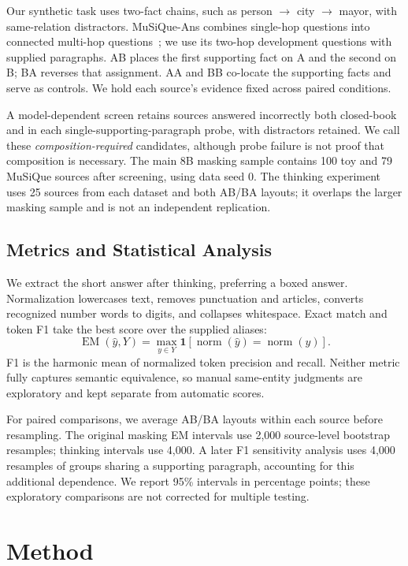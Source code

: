 \documentclass[sigconf,nonacm]{acmart}
\newcommand{\EM}{\operatorname{EM}}
\begin{document}
Our synthetic task uses two-fact chains, such as person $\rightarrow$ city
$\rightarrow$ mayor, with same-relation distractors. MuSiQue-Ans combines
single-hop questions into connected multi-hop questions~\cite{musique2022};
we use its two-hop development questions with supplied paragraphs.
AB places the first supporting fact on A and the second on B; BA reverses
that assignment. AA and BB co-locate the supporting facts and serve as
controls. We hold each source's evidence fixed across paired conditions.

A model-dependent screen retains sources answered incorrectly both
closed-book and in each single-supporting-paragraph probe, with distractors
retained. We call these \emph{composition-required} candidates, although
probe failure is not proof that composition is necessary. The main 8B
masking sample contains 100 toy and 79 MuSiQue sources after screening,
using data seed 0. The thinking experiment uses 25 sources from each
dataset and both AB/BA layouts; it overlaps the larger masking sample
and is not an independent replication.

\subsection{Metrics and Statistical Analysis}
We extract the short answer after thinking, preferring a boxed answer.
Normalization lowercases text, removes punctuation and articles, converts
recognized number words to digits, and collapses whitespace. Exact match
and token F1 take the best score over the supplied aliases:
\begin{equation}
\EM(\hat y,Y)=\max_{y\in Y}
\mathbf{1}[\operatorname{norm}(\hat y)=\operatorname{norm}(y)].
\end{equation}
F1 is the harmonic mean of normalized token precision and recall. Neither
metric fully captures semantic equivalence, so manual same-entity judgments
are exploratory and kept separate from automatic scores.

For paired comparisons, we average AB/BA layouts within each source before
resampling. The original masking EM intervals use 2,000 source-level bootstrap
resamples; thinking intervals use 4,000. A later F1 sensitivity analysis uses
4,000 resamples of groups sharing a supporting paragraph, accounting for
this additional dependence. We report 95\% intervals in percentage points;
these exploratory comparisons are not corrected for multiple testing.

\section{Method}
\end{document}
